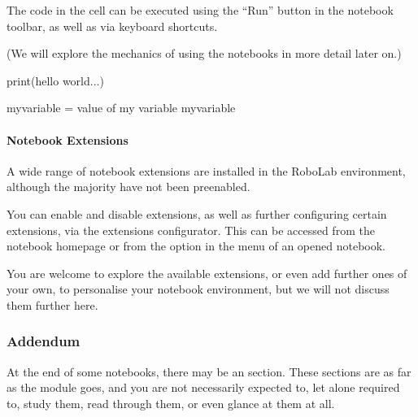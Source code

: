 \documentclass[letterpaper,10pt,english]{sphinxmanual}
\let\sphinxpxdimen\pdfpxdimen\else\newdimen\sphinxpxdimen
\begin{document}
The code in the cell can be executed using the “Run” button in the notebook toolbar, as well as via keyboard shortcuts.

(We will explore the mechanics of using the notebooks in more detail later on.)

{
\begin{sphinxVerbatim}[commandchars=\\\{\}]
\llap{\color{nbsphinxin}[ ]:\,\hspace{\fboxrule}\hspace{\fboxsep}}print(\PYGZdq{}hello world...\PYGZdq{})

my\PYGZus{}variable = \PYGZdq{}value of my variable\PYGZdq{}
my\PYGZus{}variable
\end{sphinxVerbatim}
}


\paragraph{Notebook Extensions}
\label{\detokenize{content/00_SOFTWARE_GUIDE/Section_00_01_Jupyter_environment:Notebook-Extensions}}
A wide range of notebook extensions are installed in the RoboLab environment, although the majority have not been pre\sphinxhyphen{}enabled.

You can enable and disable extensions, as well as further configuring certain extensions, via the extensions configurator. This can be accessed from the notebook homepage or from the  option in the  menu of an opened notebook.

\sphinxincludegraphics[width=1858\sphinxpxdimen,height=1440\sphinxpxdimen]{{00_01_nbextension_config}.png}

You are welcome to explore the available extensions, or even add further ones of your own, to personalise your notebook environment, but we will not discuss them further here.



\subsubsection{Addendum}
\label{\detokenize{content/00_SOFTWARE_GUIDE/Section_00_01_Jupyter_environment:Addendum}}
At the end of some notebooks, there may be an  section. These sections are  as far as the module goes, and you are not necessarily expected to, let alone required to, study them, read through them, or even glance at them at all.
\end{document}
